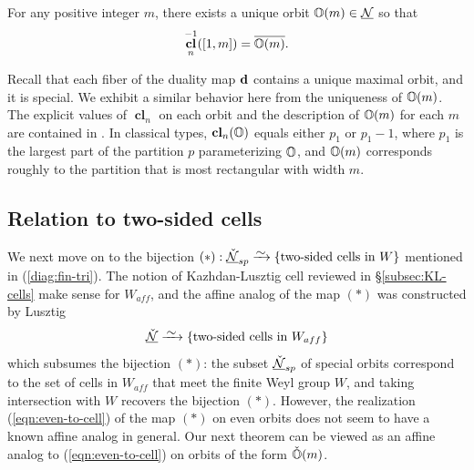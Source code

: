 \documentclass[reqno]{amsart}
\newcommand{\ubar}[1]{\underline{#1}}
\DeclareMathOperator{\cl}{\mathbf{cl}}
\begin{document}
\begin{theorem}\label{thm:Om}
	For any positive integer $m$, there exists a unique orbit $\BO(m) \in \ubar \cN$ so that
	\begin{equation*}
		\cl_n\inv([1,m]) = \overline{\BO(m)}.
	\end{equation*}
\end{theorem}

Recall that each fiber of the duality map $\mathbf{d}$ contains a unique maximal orbit, and it is special. We exhibit a similar behavior here from the uniqueness of $\mathbb{O}(m)$. The explicit values of $\cl_n$ on each orbit and the description of $\mathbb{O}(m)$ for each $m$ are contained in \cite[\S2.1]{SYZ:cl}. In classical types, $\cl_n(\BO)$ equals either $p_1$ or $p_1-1$, where $p_1$ is the largest part of the partition $p$ parameterizing $\mathbb{O}$, and $\mathbb{O}(m)$ corresponds roughly to the partition that is most rectangular with width $m$.

\subsection{Relation to two-sided cells}\label{subsec:cl-cells}

We next move on to the bijection $(\ast): \ubar{\check \cN}_{sp} \bij \{\text{two-sided cells in }W\}$ mentioned in (\ref{diag:fin-tri}). The notion of Kazhdan-Lusztig cell reviewed in \S\ref{subsec:KL-cells} make sense for $W_{aff}$, and the affine analog of the map $(\ast)$ was constructed by Lusztig \cite[Theorem 4.8]{Lusztig:aff-cells-4}
\begin{equation}\label{eqn:Lusztig-bij}
	\ubar{\check \cN} \bijects \{\text{two-sided cells in } W_{aff}\}
\end{equation}
which subsumes the bijection $(\ast)$: the subset $\ubar{\check \cN}_{sp}$ of special orbits correspond to the set of cells in $W_{aff}$ that meet the finite Weyl group $W$, and taking intersection with $W$ recovers the bijection $(\ast)$. However, the realization (\ref{eqn:even-to-cell}) of the map $(\ast)$ on even orbits does not seem to have a known affine analog in general. Our next theorem can be viewed as an affine analog to (\ref{eqn:even-to-cell}) on orbits of the form $\check {\mathbb{O}}(m)$.
\end{document}
